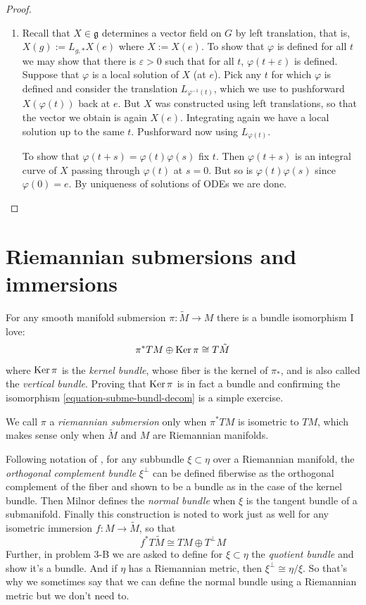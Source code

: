 \begin{proof}
\begin{enumerate}
\item Recall that $X \in \mathfrak{g}$
determines a vector field on $G$
by left translation, that is,
$X(g):=L_{g,*}X(e)$ where $X:=X(e)$.
To show that $\varphi$ is defined for all $t$
we may show that there is $\varepsilon>0$
such that for all $t$,
$\varphi(t+\varepsilon)$ is defined.
Suppose that $\varphi$ is a local solution of
$X$ (at $e$).
Pick any $t$ for which $\varphi$ is defined
and consider the translation
$L_{\varphi^{-1}(t)}$, which we use to
pushforward $X(\varphi(t))$
back at $e$.
But $X$ was constructed using left
translations,
so that the vector we obtain is again $X(e)$.
Integrating again we have a local solution up
to the same $t$.
Pushforward now using $L_{\varphi(t)}$.

To show that
$\varphi(t+s)=\varphi(t)\varphi(s)$
fix $t$. Then $\varphi(t+s)$ is an integral
curve of $X$
passing through $\varphi(t)$ at $s=0$.
But so is $\varphi(t)\varphi(s)$ since
$\varphi(0)=e$.
By uniqueness of solutions of ODEs we are
done.
\end{enumerate}
\end{proof}


\section{Riemannian submersions and
immersions}
\label{section-riema-subme-immer}

For any smooth manifold submersion
$\pi:\tilde{M}\to M$ there is a bundle
isomorphism I love:
\begin{equation}
\label{equation-subme-bundl-decom}
\pi^*TM \oplus \mathop{\mathrm{Ker}} \pi\cong
T\tilde{M} \end{equation}
 where $\mathop{\mathrm{Ker}}\pi$ is the {\it kernel bundle},
 whose
fiber is the kernel of $\pi_*$, and is also
called the {\it vertical bundle}.
Proving that $\mathop{\mathrm{Ker}}\pi$ is in fact a bundle
and confirming the isomorphism
\ref{equation-subme-bundl-decom} is a simple
exercise.

We call $\pi$ a {\it riemannian submersion}
only when $\pi^*TM$ is isometric to
$TM$, which makes sense only when $\tilde{M}$
and $M$ are Riemannian manifolds.

Following notation of
\cite{Milnor-Characteristic-Classes}, for any
subbundle
$\xi \subset\eta$ over a Riemannian manifold,
the {\it orthogonal complement
bundle} $\xi^\perp$ can be defined fiberwise
as the orthogonal complement of the
fiber and shown to be a bundle as in the case
of the kernel bundle. Then Milnor
defines the {\it normal bundle} when $\xi$ is
the tangent bundle of a
submanifold. Finally this construction is
noted to work just as well for any
isometric immersion $f:M\to \tilde{M}$, so
that
\begin{equation}
\label{equation-immer-bundl-decom}
f^*T\tilde{M}\cong TM\oplus T^\perp M
\end{equation}
Further, in problem 3-B we are asked to
define for $\xi \subset \eta$ the {\it
quotient bundle} and show it's a bundle. And
if $\eta$ has a Riemannian metric,
then $\xi^\perp\cong\eta/\xi$. So that's why
we sometimes say that we can define
the normal bundle using a Riemannian metric
but we don't need to.

